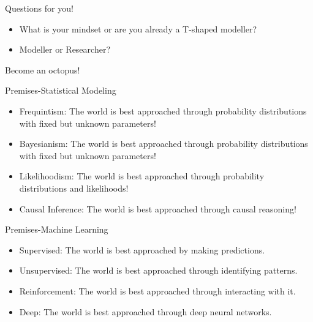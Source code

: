 \documentclass[aspectratio=169]{beamer}
\begin{document}
\begin{frame}{Questions for you!}
  \begin{itemize}
    \item What is your mindset or are you already a T-shaped modeller?
    \item Modeller or Researcher?
  \end{itemize}
\end{frame}

\begin{frame}{}
  \color{Pink} Become an octopus! 
\end{frame}

\begin{frame}{Premises-Statistical Modeling}
  \begin{itemize}
    \item Frequintism: The world is best approached through probability distributions with fixed but unknown parameters!
    \item Bayesianism: The world is best approached through probability distributions with fixed but unknown parameters! 
    \item Likelihoodism: The world is best approached through probability distributions and likelihoods!
    \item Causal Inference: The world is best approached through causal reasoning!
  \end{itemize}
\end{frame}

\begin{frame}{Premises-Machine Learning}
  \begin{itemize}
    \item Supervised: The world is best approached by making predictions.
    \item Unsupervised: The world is best approached through identifying patterns.
    \item Reinforcement: The world is best approached through interacting with it.
    \item Deep: The world is best approached through deep neural networks.
  \end{itemize}
\end{frame}
\end{document}
